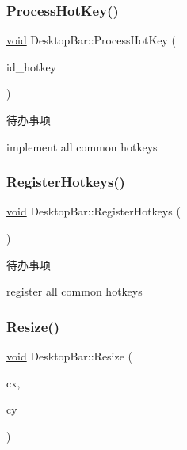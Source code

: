 \subsubsection{\texorpdfstring{Process\+Hot\+Key()}{ProcessHotKey()}}
{\footnotesize\ttfamily \hyperlink{interfacevoid}{void} Desktop\+Bar\+::\+Process\+Hot\+Key (\begin{DoxyParamCaption}\item[{int}]{id\+\_\+hotkey }\end{DoxyParamCaption})\hspace{0.3cm}{\ttfamily [protected]}}

\begin{DoxyRefDesc}{待办事项}
\item[\hyperlink{todo__todo000052}{待办事项}]implement all common hotkeys \end{DoxyRefDesc}
\mbox{\label{struct_desktop_bar_a3a29770a6acbd3e0b6e0cb286d462b58}} 
\subsubsection{\texorpdfstring{Register\+Hotkeys()}{RegisterHotkeys()}}
{\footnotesize\ttfamily \hyperlink{interfacevoid}{void} Desktop\+Bar\+::\+Register\+Hotkeys (\begin{DoxyParamCaption}{ }\end{DoxyParamCaption})\hspace{0.3cm}{\ttfamily [protected]}}

\begin{DoxyRefDesc}{待办事项}
\item[\hyperlink{todo__todo000051}{待办事项}]register all common hotkeys \end{DoxyRefDesc}
\mbox{\label{struct_desktop_bar_a09a6f166765537c7f7bcc41220ea3d58}} 
\subsubsection{\texorpdfstring{Resize()}{Resize()}}
{\footnotesize\ttfamily \hyperlink{interfacevoid}{void} Desktop\+Bar\+::\+Resize (\begin{DoxyParamCaption}\item[{int}]{cx,  }\item[{int}]{cy }\end{DoxyParamCaption})\hspace{0.3cm}{\ttfamily [protected]}}

